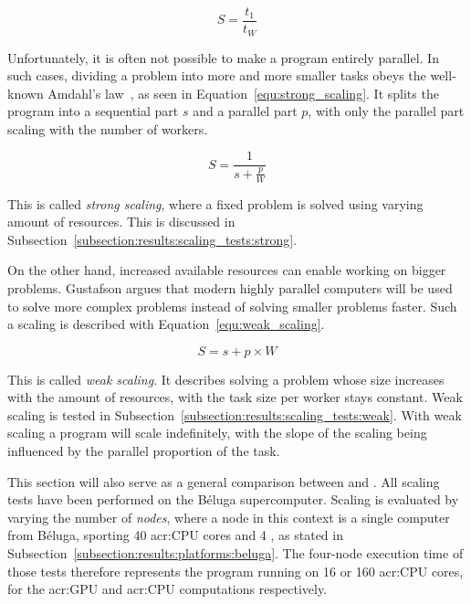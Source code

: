 \begin{equation} \label{equ:scaling}
	S = \frac{t_1}{t_W}
\end{equation}

Unfortunately, it is often not possible to make a program entirely parallel. In such cases, dividing
a problem into more and more smaller tasks obeys the well-known Amdahl's law~\cite{Amdahl1967}, as
seen in Equation~\ref{equ:strong_scaling}. It splits the program into a sequential part \(s\) and a
parallel part \(p\), with only the parallel part scaling with the number of workers.

\begin{equation} \label{equ:strong_scaling}
	S = \frac{1}{s + \frac{p}{W}}
\end{equation}

This is called \textit{strong scaling}, where a fixed problem is solved using varying amount of
resources. This is discussed in Subsection~\ref{subsection:results:scaling_tests:strong}.

On the other hand, increased available resources can enable working on bigger problems. Gustafson
argues that modern highly parallel computers will be used to solve more complex problems instead of
solving smaller problems faster. Such a scaling is described with Equation~\ref{equ:weak_scaling}.

\begin{equation} \label{equ:weak_scaling}
	S = s + p \times W
\end{equation}

This is called \textit{weak scaling}. It describes solving a problem whose size increases with the
amount of resources, with the task size per worker stays constant. Weak scaling is tested in
Subsection~\ref{subsection:results:scaling_tests:weak}. With weak scaling a program will scale
indefinitely, with the slope of the scaling being influenced by the parallel proportion of the task.

This section will also serve as a general comparison between  and
. All scaling tests have been performed on the Béluga supercomputer. Scaling is
evaluated by varying the number of \textit{nodes}, where a node in this context is a single computer
from Béluga, sporting 40 \acrshort{acr:CPU} cores and 4 , as stated in
Subsection~\ref{subsection:results:platforms:beluga}. The four-node execution time of those tests
therefore represents the program running on 16  or 160 \acrshort{acr:CPU} cores,
for the \acrshort{acr:GPU} and \acrshort{acr:CPU} computations respectively.

